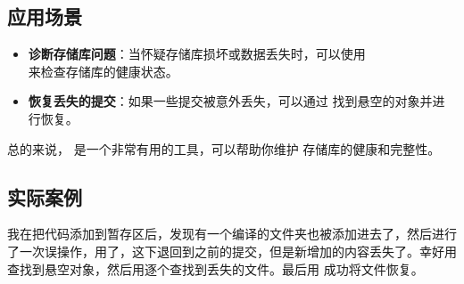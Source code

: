 \subsection*{应用场景}
\begin{itemize}
	\item \textbf{诊断存储库问题}：当怀疑存储库损坏或数据丢失时，可以使用\\  来检查存储库的健康状态。
	\item \textbf{恢复丢失的提交}：如果一些提交被意外丢失，可以通过  找到悬空的对象并进行恢复。
\end{itemize}

总的来说， 是一个非常有用的工具，可以帮助你维护  存储库的健康和完整性。

\subsection*{实际案例}
我在把代码添加到暂存区后，发现有一个编译的文件夹也被添加进去了，然后进行了一次误操作，用了，这下退回到之前的提交，但是新增加的内容丢失了。幸好用查找到悬空对象，然后用逐个查找到丢失的文件。最后用 成功将文件恢复。
